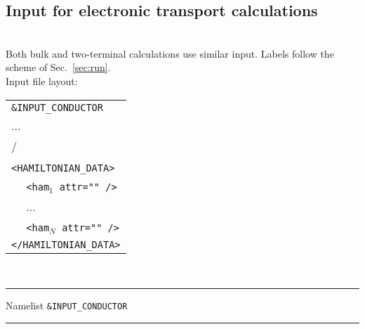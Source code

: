 \subsection{Input for electronic transport calculations}
\\
\noindent Both bulk and two-terminal calculations use similar input.
Labels follow the scheme of Sec.~\ref{sec:run}.\\

\noindent Input file layout: \\

%
%
\begin{tabular}{l}
{\tt \&INPUT\_CONDUCTOR }\\
   ... \\
  / \\
  \\
{\tt <HAMILTONIAN\_DATA>} \\
  $\quad$ {\tt <ham$_1$   attr="" />} \\
  $\quad$ ...  \\
  $\quad$ {\tt <ham$_N$   attr="" />} \\
{\tt </HAMILTONIAN\_DATA>}
%
\end{tabular}
%
%
\\

\begin{centering}
\rule{2.2in}{0.01in} Namelist {\tt \&INPUT\_CONDUCTOR} \rule{2.2in}{0.01in}
\end{centering}\\

